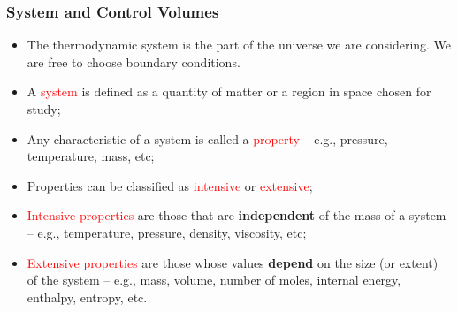 \documentclass[10pt,compress,handout,unknownkeysallowed]{beamer}
\begin{document}
\begin{frame}
 \frametitle{System and Control Volumes}
 \begin{itemize}
  \item <2-> The thermodynamic system is the part of the universe we are considering. We are free to choose boundary conditions.
  \item <3-> A \textcolor{red}{system} is defined as a quantity of matter or a region in space chosen for study;
  \item <4-> Any characteristic of a system is called a \textcolor{red}{property} -- e.g., pressure, temperature, mass, etc;
  \item <5-> Properties can be classified as \textcolor{red}{intensive} or \textcolor{red}{extensive};
  \item <6-> \textcolor{red}{Intensive properties} are those that are {\bf independent} of the mass of a system -- e.g., temperature, pressure, density, viscosity, etc;
  \item <7-> \textcolor{red}{Extensive properties} are those whose values {\bf depend} on the size (or extent) of the system -- e.g., mass, volume, number of moles, internal energy, enthalpy, entropy, etc.  
 \end{itemize}
\end{frame}
\end{document}
